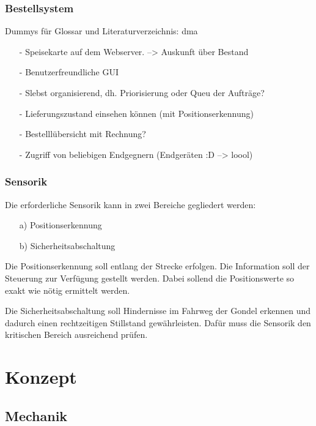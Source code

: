 \subsection{Bestellsystem}

Dummys für Glossar und Literaturverzeichnis:
\acrfull{dma} \cite{knuth84}

\begin{itemize}
	\item [-] Speisekarte auf dem Webserver. --> Auskunft über Bestand
	\item [-] Benutzerfreundliche GUI
	\item [-] Slebst organisierend, dh. Priorisierung oder Queu der Aufträge? 
	\item [-] Lieferungszustand einsehen können (mit Positionserkennung)
	\item [-] Bestelllübersicht mit Rechnung? 
	\item [-] Zugriff von beliebigen Endgegnern (Endgeräten :D --> loool)
\end{itemize}

\subsection{Sensorik}
Die erforderliche Sensorik kann in zwei Bereiche gegliedert werden: 

\begin{itemize}
	\item [a)] Positionserkennung 
	\item [b)] Sicherheitsabschaltung 
	
\end{itemize}

Die Positionserkennung soll entlang der Strecke erfolgen. Die Information soll der Steuerung zur Verfügung gestellt werden. Dabei sollend die Positionswerte so exakt wie nötig ermittelt werden.

Die Sicherheitsabschaltung soll Hindernisse im Fahrweg der Gondel erkennen und dadurch einen rechtzeitigen Stillstand gewährleisten. Dafür muss die Sensorik den kritischen Bereich ausreichend prüfen. 





\chapter{Konzept}
\section{Mechanik}

